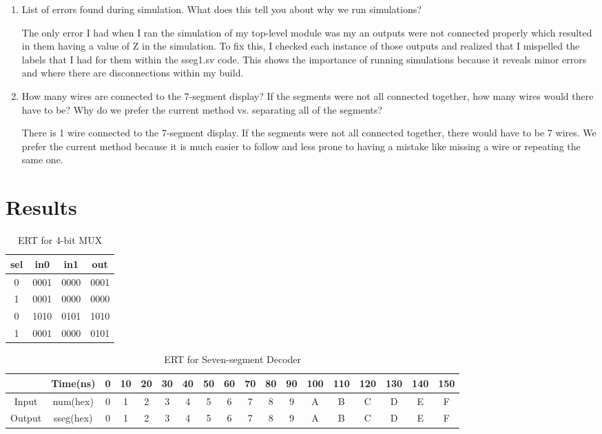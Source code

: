\documentclass[11pt]{article}
\begin{document}
\begin{enumerate}
	\item List of errors found during simulation. What does this tell you about why we run simulations?
	
	The only error I had when I ran the simulation of my top-level module was my an outputs were not connected properly which resulted in them having a value of Z in the simulation. To fix this, I checked each instance of those outputs and realized that I mispelled the labels that I had for them within the sseg1.sv code.
	This shows the importance of running simulations because it reveals minor errors and where there are disconnections within my build.
	
	\item How many wires are connected to the 7-segment display? If the segments were not all connected together, how many wires would there have to be? Why do we prefer the current method vs. separating all of the segments?
	
	There is 1 wire connected to the 7-segment display. If the segments were not all connected together, there would have to be 7 wires. We prefer the current method because it is much easier to follow and less prone to having a mistake like missing a wire or repeating the same one.
	
\end{enumerate}


\section*{Results}

\begin{table}[ht]\centering
	\caption{ERT for 4-bit MUX}
	\label{tbl:example_table}
	\begin{tabular}{ccc|c}
		\toprule
		sel & in0 & in1 & out \\
		\midrule
		0 & 0001 & 0000 & 0001 \\
		1 & 0001 & 0000 & 0000 \\
		0 & 1010 & 0101 & 1010 \\
		1 & 0001 & 0000 & 0101 \\
		\bottomrule
	\end{tabular} 
\end{table}

\begin{table}[ht]\centering
	\caption{ERT for Seven-segment Decoder}
	\label{tbl:example_table}
	\begin{tabular}{cc|cccccccccccccccc}
		\toprule
		& Time(ns) & 0 & 10 & 20 & 30 & 40 & 50 & 60 & 70 & 80 & 90 & 100 & 110 & 120 & 130 & 140 & 150 \\
		\midrule
		Input & num(hex) & 0 & 1 & 2 & 3 & 4 & 5 & 6 & 7 & 8 & 9 & A & B & C & D & E & F \\
		Output & sseg(hex)  & 0 & 1 & 2 & 3 & 4 & 5 & 6 & 7 & 8 & 9 & A & B & C & D & E & F \\
		\bottomrule
	\end{tabular} 
\end{table}
\end{document}
